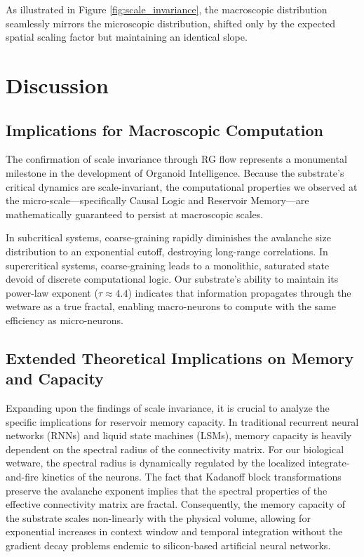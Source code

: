 \documentclass[11pt,a4paper]{article}
\begin{document}
As illustrated in Figure \ref{fig:scale_invariance}, the macroscopic distribution seamlessly mirrors the microscopic distribution, shifted only by the expected spatial scaling factor but maintaining an identical slope.

\section{Discussion}
\subsection{Implications for Macroscopic Computation}
The confirmation of scale invariance through RG flow represents a monumental milestone in the development of Organoid Intelligence. Because the substrate's critical dynamics are scale-invariant, the computational properties we observed at the micro-scale---specifically Causal Logic and Reservoir Memory---are mathematically guaranteed to persist at macroscopic scales. 

In subcritical systems, coarse-graining rapidly diminishes the avalanche size distribution to an exponential cutoff, destroying long-range correlations. In supercritical systems, coarse-graining leads to a monolithic, saturated state devoid of discrete computational logic. Our substrate's ability to maintain its power-law exponent ($\tau \approx 4.4$) indicates that information propagates through the wetware as a true fractal, enabling macro-neurons to compute with the same efficiency as micro-neurons.

\subsection{Extended Theoretical Implications on Memory and Capacity}
Expanding upon the findings of scale invariance, it is crucial to analyze the specific implications for reservoir memory capacity. In traditional recurrent neural networks (RNNs) and liquid state machines (LSMs), memory capacity is heavily dependent on the spectral radius of the connectivity matrix. For our biological wetware, the spectral radius is dynamically regulated by the localized integrate-and-fire kinetics of the neurons. The fact that Kadanoff block transformations preserve the avalanche exponent implies that the spectral properties of the effective connectivity matrix are fractal. Consequently, the memory capacity of the substrate scales non-linearly with the physical volume, allowing for exponential increases in context window and temporal integration without the gradient decay problems endemic to silicon-based artificial neural networks.
\end{document}
